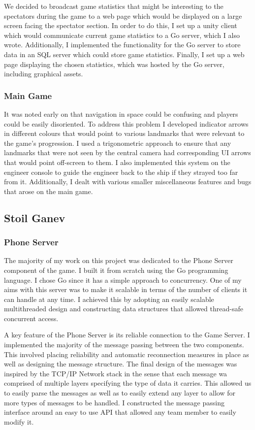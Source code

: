 \documentclass[a4paper,11pt]{article}
\begin{document}
We decided to broadcast game statistics that might be interesting to the spectators during the game to a web page which would be displayed on a large screen facing the spectator section. In order to do this, I set up a unity client which would communicate current game statistics to a Go server, which I also wrote. Additionally, I implemented the functionality for the Go server to store data in an SQL server which could store game statistics. Finally, I set up a web page displaying the chosen statistics, which was hosted by the Go server, including graphical assets.

\subsubsection{Main Game}

It was noted early on that navigation in space could be confusing and players could be easily disoriented. To address this problem I developed indicator arrows in different colours that would point to various landmarks that were relevant to the game’s progression. I used a trigonometric approach to ensure that any landmarks that were not seen by the central camera had corresponding UI arrows that would point off-screen to them. I also implemented this system on the engineer console to guide the engineer back to the ship if they strayed too far from it. Additionally, I dealt with various smaller miscellaneous features and bugs that arose on the main game.

\clearpage

\subsection{Stoil Ganev}

\subsubsection{Phone Server}

The majority of my work on this project was dedicated to the Phone Server component of the game. I built it from scratch using the Go programming language. I chose Go since it has a simple approach to concurrency. One of my aims with this server was to make it scalable in terms of the number of clients it can handle at any time. I achieved this by adopting an easily scalable multithreaded design and constructing data structures that allowed thread-safe concurrent access.

A key feature of the Phone Server is its reliable connection to the Game Server. I implemented the majority of the message passing between the two components. This involved placing reliability and automatic reconnection measures in place as well as designing the message structure. The final design of the messages was inspired by the TCP/IP Network stack in the sense that each message wa comprised of multiple layers specifying the type of data it carries. This allowed us to easily parse the messages as well as to easily extend any layer to allow for more types of messages to be handled. I constructed the message passing interface around an easy to use API that allowed any team member to easily modify it.
\end{document}
